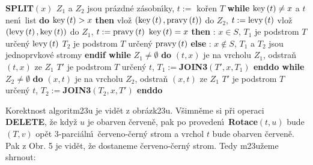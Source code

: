 {\bf SPLIT$\left(x\right)$\newline 
$Z_1$} a $Z_2$ jsou pr\'azdn\'e z\'asobn\'\i ky, $t:=\text{ ko\v ren }T$\newline 
{\bf while} $\operatorname{key}\left(t\right)\ne x$ a $t$ nen\'\i\ list {\bf do}\newline 
\phantom{---}{\bf if} $\operatorname{key}\left(t\right)>x$ {\bf then}\newline 
\phantom{------}vlo\v z $\left(\operatorname{key}\left(t\right),\operatorname{pravy}\left(t\right)\right)$ do $Z_2$, $t:=\operatorname{levy}\left(t\right)$ \newline 
\phantom{---}{\bf else}\newline 
\phantom{------}vlo\v z $\left(\operatorname{levy}\left(t\right),\operatorname{key}\left(t\right)\right)$ do $Z_1$, $t:=\operatorname{pravy}\left(t\right)$ \newline 
\phantom{---}{\bf endif\newline 
enddo \newline 
if} $\operatorname{key}\left(t\right)=x$ {\bf then}\newline 
\phantom{---}{\bf V\'ystup}: $x\in S$, $T_1$ je podstrom $T$ ur\v cen\'y $\operatorname{levy}\left(t\right)$ \newline 
\phantom{---}$T_2$ je podstrom $T$ ur\v cen\'y $\operatorname{pravy}\left(t\right)$ \newline 
{\bf else}\newline 
\phantom{---}{\bf V\'ystup}: $x\notin S$, $T_1$ a $T_2$ jsou jednoprvkov\'e stromy\newline 
{\bf endif \newline 
while} $Z_1\ne\emptyset$ {\bf do}\newline 
\phantom{---}$\left(t,x\right)$ je na vrcholu $Z_1$, odstra\v n $\left(t,x\right)$ ze $Z_1$ \newline 
\phantom{---}$T'$ je podstrom $T$ ur\v cen\'y $t$, $T_1:=${\bf JOIN3$\left(T',x,T_1
\right)$ \newline 
enddo\newline 
while} $Z_2\ne\emptyset$ {\bf do}\newline 
\phantom{---}$\left(x,t\right)$ je na vrcholu $Z_2$, odstra\v n $\left(x,t\right)$ ze $Z_1$ \newline 
\phantom{---}$T'$ je podstrom $T$ ur\v cen\'y $t$, $T_2:=${\bf JOIN3$\left(T_2,x,T'
\right)$ \newline 
enddo}
\medskip

\flushpar Korektnost algoritm\accent23u je vid\v et z 
obr\'azk\accent23u. V\v simn\v eme si p\v ri ope\-raci {\bf DELETE}, \v ze kdy\v z $
u$ je 
obarven \v cerven\v e, pak po proveden\'\i\ {\bf Rotace$\left(t,u\right)$} bude $
\left(T,v\right)$ op\v et 
3-parci\'aln\'\i\ \v cerveno-\v cern\'y strom a vrchol $t$ bude obarven \v cerven\v e.  
Pak z Obr.  5 je vid\v et, \v ze dostaneme \v cerveno-\v cern\'y 
strom. Tedy m\accent23u\v zeme shrnout:


